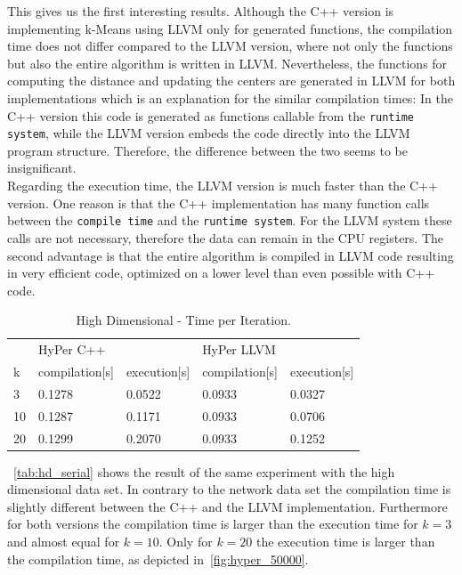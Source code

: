 This gives us the first interesting results. Although the C++ version is implementing k-Means using LLVM only for generated functions, the compilation time does not differ compared to the LLVM version, where not only the functions but also the entire algorithm is written in LLVM. Nevertheless, the functions for computing the distance and updating the centers are generated in LLVM for both implementations which is an explanation for the similar compilation times: In the C++ version this code is generated as functions callable from the \texttt{runtime system}, while the LLVM version embeds the code directly into the LLVM program structure. Therefore, the difference between the two seems to be insignificant.
\\
Regarding the execution time, the LLVM version is much faster than the C++ version. One reason is that the C++ implementation has many function calls between the \texttt{compile time} and the \texttt{runtime system}. For the LLVM system these calls are not necessary, therefore the data can remain in the CPU registers. The second advantage is that the entire algorithm is compiled in LLVM code resulting in very efficient code, optimized on a lower level than even possible with C++ code.


\begin{table}[htsb]
  \caption[High Dimensional - Time per Iteration]{High Dimensional - Time per Iteration.}\label{tab:hd_serial}
  \centering
  \begin{tabular}{l l l l l}
    \toprule
      & HyPer C++ & & HyPer LLVM & \\
      k & compilation[s] & execution[s] & compilation[s] & execution[s] \\
    \midrule
      3  & 0.1278 & 0.0522 & 0.0933 & 0.0327 \\
      10 & 0.1287 & 0.1171 & 0.0933 & 0.0706 \\
      20 & 0.1299 & 0.2070 & 0.0933 & 0.1252 \\
    \bottomrule
  \end{tabular}
\end{table}

~\autoref{tab:hd_serial} shows the result of the same experiment with the high dimensional data set. In contrary to the network data set the compilation time is slightly different between the C++ and the LLVM implementation. Furthermore for both versions the compilation time is larger than the execution time for $k = 3$ and almost equal for $k = 10$. Only for $k = 20$ the execution time is larger than the compilation time, as depicted in~\autoref{fig:hyper_50000}.

